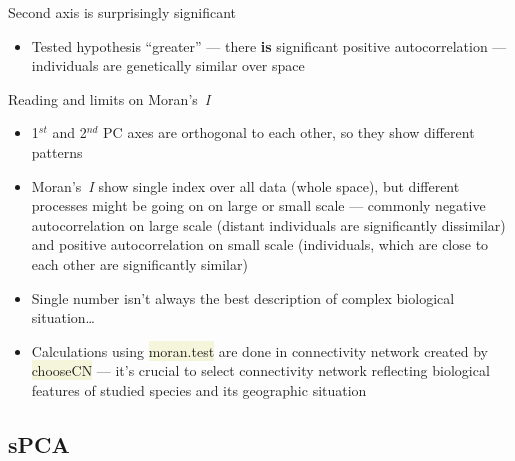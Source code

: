 \documentclass[compress, ucs, xelatex, 11pt, xcolor=svgnames, aspectratio=169,
	hyperref={
		bookmarks=true,
		unicode=true,
		colorlinks=true,
		pdftitle={Molecular data in R},
		plainpages=false,
		pdfauthor={Vojtech Zeisek},
		pdfsubject={Course about phylogeny and evolution in R},
		pdfcreator={XeLaTeX},
		pdfkeywords={R, evolution, phylogeny, molecular data},
		linkcolor=Crimson, %
		anchorcolor=Magenta, %
		citecolor=Magenta, %
		filecolor=Magenta, %
		menucolor=Magenta, %
		urlcolor=DodgerBlue, %
		pdftex},
	url={hyphens, lowtilde} %
	]{beamer}
\renewcommand{\texttt}[1]{\colorbox{Beige}{{\ttfamily #1}}}
\begin{document}
\begin{frame}{Second axis is surprisingly significant}
	\begin{center}
		\texttt{[image: moran2.png]}
	\end{center}
	\begin{itemize}
		\item Tested hypothesis \enquote{greater} --- there \textbf{is} significant positive autocorrelation --- individuals are genetically similar over space
	\end{itemize}
\end{frame}

\begin{frame}{Reading and limits on Moran's~\textit{I}}
	\begin{itemize}
		\item 1$^{st}$ and 2$^{nd}$ PC axes are orthogonal to each other, so they show different patterns
		\item Moran's~\textit{I} show single index over all data (whole space), but different processes might be going on on large or small scale --- commonly negative autocorrelation on large scale (distant individuals are significantly dissimilar) and positive autocorrelation on small scale (individuals, which are close to each other are significantly similar)
		\item Single number isn't always the best description of complex biological situation\ldots
		\item Calculations using \texttt{moran.test} are done in connectivity network created by \texttt{chooseCN} --- it's crucial to select connectivity network reflecting biological features of studied species and its geographic situation
	\end{itemize}
\end{frame}

\subsection{sPCA}
\end{document}
